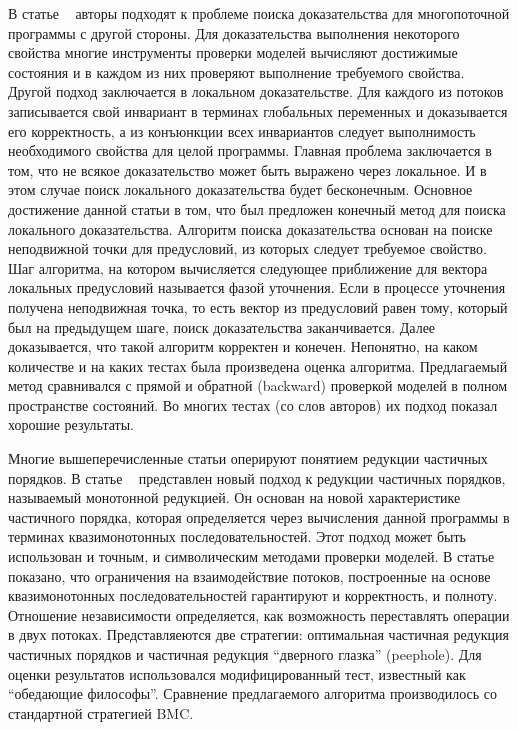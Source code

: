 В статье ~\cite{Cohen:2009} авторы подходят к проблеме поиска доказательства для многопоточной программы с другой стороны. 
Для доказательства выполнения некоторого свойства многие инструменты проверки моделей вычисляют достижимые состояния и в каждом из них проверяют выполнение требуемого свойства. Другой подход заключается в локальном доказательстве. Для каждого из потоков записывается свой инвариант в терминах глобальных переменных и доказывается его корректность, а из конъюнкции всех инвариантов следует выполнимость необходимого свойства для целой программы. 
Главная проблема заключается в том, что не всякое доказательство может быть выражено через локальное. И в этом случае поиск локального доказательства будет бесконечным. Основное достижение данной статьи в том, что был предложен конечный метод для поиска локального доказательства. 
Алгоритм поиска доказательства основан на поиске неподвижной точки для предусловий, из которых следует требуемое свойство. Шаг алгоритма, на котором вычисляется следующее приближение для вектора локальных предусловий называется фазой уточнения. Если в процессе уточнения получена неподвижная точка, то есть вектор из предусловий равен тому, который был на предыдущем шаге, поиск доказательства заканчивается. Далее доказывается, что такой алгоритм корректен и конечен. 
Непонятно, на каком количестве и на каких тестах была произведена оценка алгоритма. Предлагаемый метод сравнивался с прямой и обратной (backward) проверкой моделей в полном пространстве состояний. Во многих тестах (со слов авторов) их подход показал хорошие результаты. 

Многие вышеперечисленные статьи оперируют понятием редукции частичных порядков. В статье ~\cite{Kahlon:2009} представлен новый подход к редукции частичных порядков, называемый монотонной редукцией. Он основан на новой характеристике частичного порядка, которая определяется через вычисления данной программы в терминах квазимонотонных последовательностей. Этот подход может быть использован и точным, и символическим методами проверки моделей. В статье показано, что ограничения на взаимодействие потоков, построенные на основе квазимонотонных последовательностей гарантируют и корректность, и полноту. 
Отношение независимости определяется, как возможность переставлять операции в двух потоках. Представляеются две стратегии: оптимальная частичная редукция частичных порядков и частичная редукция “дверного глазка” (peephole).
Для оценки результатов использовался модифицированный тест, известный как “обедающие философы”. Сравнение предлагаемого алгоритма производилось со стандартной стратегией BMC.

